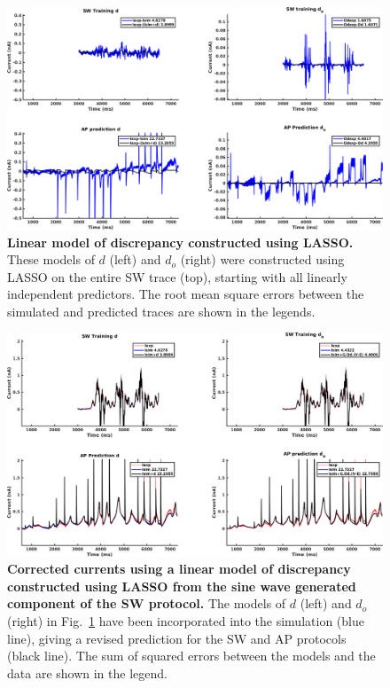 \documentclass[11pt,a4paper,oneside]{article}
\begin{document}
\begin{figure}[t]
\begin{center}
\includegraphics[scale=0.42]{Figures/LASSO_SW_AP_core_discrepancy.png}
\caption{\textbf{Linear model of discrepancy constructed using LASSO.} These models of $d$ (left) and $d_o$ (right) were constructed using LASSO on the entire SW trace (top), starting with all linearly independent predictors. The root mean square errors between the simulated and predicted traces are shown in the legends. } 
\label{Fig_LASSO_SW_AP_core_discrepancy}
\end{center}
\end{figure}

\begin{figure}[hb]
\begin{center}
\includegraphics[scale=0.42]{Figures/LASSO_SW_AP_core_currents.png}
\caption{\textbf{Corrected currents using a linear model of discrepancy constructed using LASSO from the sine wave generated component of the SW protocol.} The models of $d$ (left) and $d_o$ (right) in Fig.~\ref{Fig_LASSO_SW_AP_core_discrepancy} have been incorporated into the simulation (blue line), giving a revised prediction for the SW and AP protocols (black line). The sum of squared errors between the models and the data are shown in the legend.}
\label{Fig_LASSO_SW_AP_core_currents}
\end{center}
\end{figure}
\end{document}

